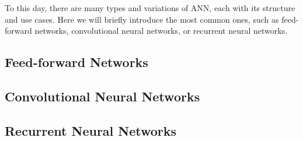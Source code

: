 
To this day, there are many types and variations of ANN, each with its structure and use cases. Here we will briefly introduce the most common ones, such as feed-forward networks, convolutional neural networks, or recurrent neural networks.

\subsection{Feed-forward Networks}

\subsection{Convolutional Neural Networks}

\subsection{Recurrent Neural Networks}

